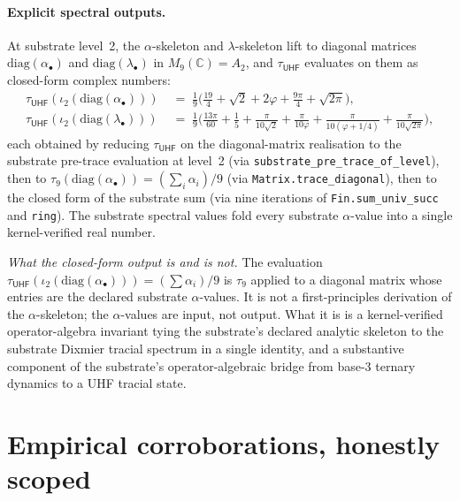 \documentclass[11pt,a4paper]{amsart}
\theoremstyle{plain}
\theoremstyle{definition}
\begin{document}
\paragraph{Explicit spectral outputs.} At substrate level~2, the $\alpha$-skeleton and $\lambda$-skeleton lift to diagonal matrices $\mathrm{diag}(\alpha_\bullet)$ and $\mathrm{diag}(\lambda_\bullet)$ in $M_9(\mathbb{C}) = A_2$, and $\tau_{\textsf{UHF}}$ evaluates on them as closed-form complex numbers:
\begin{align*}
\tau_{\textsf{UHF}}(\iota_2(\mathrm{diag}(\alpha_\bullet))) &\;=\; \tfrac{1}{9}\bigl(\tfrac{19}{4} + \sqrt{2} + 2\varphi + \tfrac{9\pi}{4} + \sqrt{2\pi}\bigr), \\[2pt]
\tau_{\textsf{UHF}}(\iota_2(\mathrm{diag}(\lambda_\bullet))) &\;=\; \tfrac{1}{9}\bigl(\tfrac{13\pi}{60} + \tfrac{1}{5} + \tfrac{\pi}{10\sqrt{2}} + \tfrac{\pi}{10\varphi} + \tfrac{\pi}{10(\varphi+1/4)} + \tfrac{\pi}{10\sqrt{2\pi}}\bigr),
\end{align*}
each obtained by reducing $\tau_{\textsf{UHF}}$ on the diagonal-matrix realisation to the substrate pre-trace evaluation at level~2 (via \texttt{substrate\_pre\_trace\_of\_level}), then to $\tau_9(\mathrm{diag}(\alpha_\bullet)) = (\sum_i \alpha_i)/9$ (via \texttt{Matrix.trace\_diagonal}), then to the closed form of the substrate sum (via nine iterations of \texttt{Fin.sum\_univ\_succ} and \texttt{ring}). The substrate spectral values fold every substrate $\alpha$-value into a single kernel-verified real number.

\emph{What the closed-form output is and is not.} The evaluation $\tau_{\textsf{UHF}}(\iota_2(\mathrm{diag}(\alpha_\bullet))) = (\sum \alpha_i)/9$ is $\tau_9$ applied to a diagonal matrix whose entries are the declared substrate $\alpha$-values. It is not a first-principles derivation of the $\alpha$-skeleton; the $\alpha$-values are input, not output. What it is is a kernel-verified operator-algebra invariant tying the substrate's declared analytic skeleton to the substrate Dixmier tracial spectrum in a single identity, and a substantive component of the substrate's operator-algebraic bridge from base-3 ternary dynamics to a UHF tracial state.

\section{Empirical corroborations, honestly scoped}\label{sec:empirical}
\end{document}
